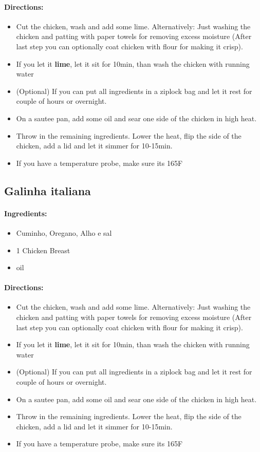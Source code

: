 \documentclass{article}
\begin{document}
\paragraph{Directions:}
\begin{itemize}
    \item Cut the chicken, wash and add some lime. Alternatively: Just washing the chicken and patting with paper towels for removing excess moisture (After last step you can optionally coat chicken with flour for making it crisp).
    \item If you let it \textbf{lime}, let it sit for 10min, than wash the chicken with running water
    \item (Optional) If you can put all ingredients in a ziplock bag and let it rest for couple of hours or overnight.
    \item On a sautee pan, add some oil and sear one side of the chicken in high heat.
    \item Throw in the remaining ingredients. Lower the heat, flip the side of the chicken, add a lid and let it simmer for 10-15min.
    \item If you have a temperature probe, make sure its 165F
\end{itemize}

\subsection{Galinha italiana}

\paragraph{Ingredients:}
\begin{itemize}
    \item Cuminho, Oregano, Alho e sal
    \item 1 Chicken Breast
    \item oil
\end{itemize}

\paragraph{Directions:}
\begin{itemize}
    \item Cut the chicken, wash and add some lime. Alternatively: Just washing the chicken and patting with paper towels for removing excess moisture (After last step you can optionally coat chicken with flour for making it crisp).
    \item If you let it \textbf{lime}, let it sit for 10min, than wash the chicken with running water
    \item (Optional) If you can put all ingredients in a ziplock bag and let it rest for couple of hours or overnight.
    \item On a sautee pan, add some oil and sear one side of the chicken in high heat.
    \item Throw in the remaining ingredients. Lower the heat, flip the side of the chicken, add a lid and let it simmer for 10-15min.
    \item If you have a temperature probe, make sure its 165F
\end{itemize}
\end{document}
